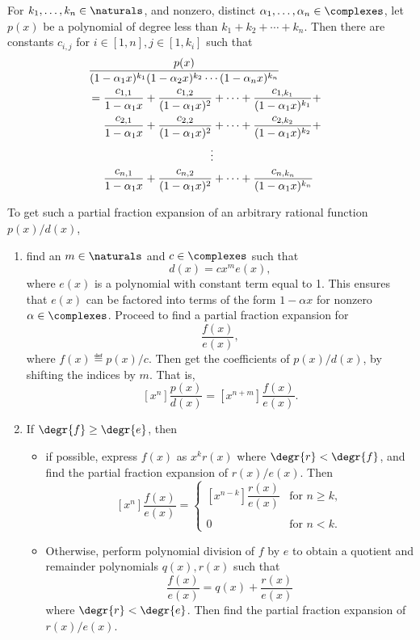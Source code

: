 \documentclass[handout]{mcs}
\begin{document}

\begin{lemma*}\label{lem:partial-fraction-distinct-roots-handout}
For $k_1,\dots, k_n \in \naturals$, and nonzero, distinct $\alpha_1,
\dots, \alpha_n \in \complexes$, let $p(x)$ be a polynomial of degree
less than $k_1+k_2+\cdots +k_n$.  Then there are constants $c_{i,j}$
for $i \in [1,n], j\in [1,k_i]$ such that
\begin{align*}
\lefteqn{\frac{p(x)}{(1-\alpha_1 x)^{k_1}(1-\alpha_2 x)^{k_2}\cdots(1-\alpha_n x)^{k_n}}}\\
& = \frac{c_{1,1}}{1-\alpha_1 x} + \frac{c_{1,2}}{(1-\alpha_1 x)^2} + \cdots + \frac{c_{1,k_1}}{(1-\alpha_1 x)^{k_1}} +\\
& \quad\ \frac{c_{2,1}}{1-\alpha_1 x} + \frac{c_{2,2}}{(1-\alpha_1 x)^2} + \cdots + \frac{c_{2,k_2}}{(1-\alpha_1 x)^{k_2}} +\\
& \hspace{1.5in} \vdots\\
& \quad\ \frac{c_{n,1}}{1-\alpha_1 x} + \frac{c_{n,2}}{(1-\alpha_1 x)^2} + \cdots + \frac{c_{n,k_n}}{(1-\alpha_1 x)^{k_n}}
\end{align*}
\end{lemma*}

To get such a partial fraction expansion of an arbitrary rational
function $p(x)/d(x)$,
\begin{enumerate}

\item find an $m \in \naturals$ and $c \in \complexes$ such that
\[
d(x) = c x^m e(x),
\]
where $e(x)$ is a polynomial with constant term equal to 1.  This
ensures that $e(x)$ can be factored into terms of the form $1-\alpha
x$ for nonzero $\alpha \in \complexes$.  Proceed to find a partial
fraction expansion for
\[
\frac{f(x)}{e(x)},
\]
where $f(x) \eqdef p(x)/c$.  Then get the coefficients of $p(x)/d(x)$,
by shifting the indices by $m$.  That is,
\[
[x^n]\frac{p(x)}{d(x)} = [x^{n+m}]\frac{f(x)}{e(x)}.
\]

\item If $\degr{f} \geq \degr{e}$, then
\begin{itemize}

\item if possible, express $f(x)$ as $x^k r(x)$ where $\degr{r} <
  \degr{f}$, and find the partial fraction expansion of $r(x)/e(x)$.
  Then
\[
[x^n]\frac{f(x)}{e(x)} =
    \begin{cases}
         [x^{n-k}]\dfrac{r(x)}{e(x)} & \text{for } n \geq k,\\
\\

          0                        & \text{for } n < k.
\end{cases}
\]

\item Otherwise, perform polynomial division of $f$ by $e$ to obtain a
  quotient and remainder polynomials $q(x), r(x)$ such that
\[
\frac{f(x)}{e(x)} = q(x) + \frac{r(x)}{e(x)}
\]
where $\degr{r} < \degr{e}$.  Then find the partial fraction
expansion of $r(x)/e(x)$.
\end{itemize}
\end{enumerate}
\end{document}
